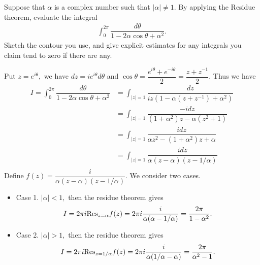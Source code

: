 \begin{problem}
Suppose that $\alpha$ is a complex number such that $|\alpha|\ne 1$. By applying the Residue theorem, evaluate the integral
\begin{align*}
    \int_0^{2\pi}\dfrac{d\theta}{1-2\alpha \cos\theta+\alpha^2}.
\end{align*}
Sketch the contour you use, and give explicit estimates for any integrals you claim tend to zero if there are any.
\begin{solution}
Put $z=e^{i\theta},$ we have $dz=ie^{i\theta}d\theta$ and $\cos \theta= \dfrac{e^{i\theta}+e^{-i\theta}}{2}=\dfrac{z+z^{-1}}{2}.$ Thus we have 
\begin{align*}
   I= \int_0^{2\pi}\dfrac{d\theta}{1-2\alpha \cos\theta+\alpha^2}&=\int_{|z|=1}\dfrac{dz}{iz(1-\alpha(z+z^{-1})+\alpha^2)}\\
    &=\int_{|z|=1}\dfrac{-i dz}{(1+\alpha^2) z-\alpha(z^2+1)}\\
    &=\int_{|z|=1}\dfrac{i dz}{\alpha z^2-(1+\alpha^2)z+\alpha}\\
    &=\int_{|z|=1}\dfrac{i dz}{\alpha(z-\alpha)(z-1/\alpha)}\\
\end{align*}
Define $f(z)=\dfrac{i}{\alpha(z-\alpha)(z-1/\alpha)}$.
We consider two cases.
\begin{itemize}
    \item[] Case 1. $|\alpha|<1,$ then the residue theorem gives 
    \begin{align*}
        I=2\pi i{\rm Res}_{z=\alpha}f(z)=2\pi i\dfrac{i}{\alpha(\alpha-1/\alpha)}=\dfrac{2\pi}{1-\alpha^2}.
    \end{align*}
    \item[]Case 2. $|\alpha|>1,$ then the residue theorem gives 
    \begin{align*}
        I=2\pi i{\rm Res}_{z=1/\alpha}f(z)=2\pi i\dfrac{i}{\alpha(1/\alpha-\alpha)}=\dfrac{2\pi}{\alpha^2-1}.
    \end{align*}
\end{itemize}
\end{solution}
\end{problem}


